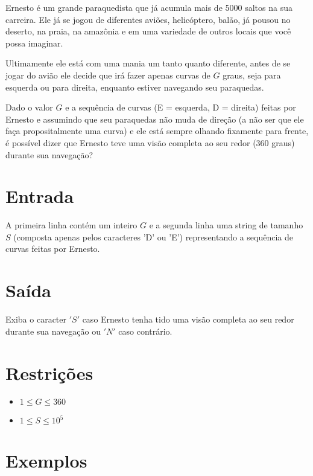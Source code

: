 Ernesto é um grande paraquedista que já acumula mais de 5000 saltos na sua carreira. Ele já se jogou de diferentes aviões, helicóptero, balão, já pousou no deserto, na praia, na amazônia e em uma variedade de outros locais que você possa imaginar. 

Ultimamente ele está com uma mania um tanto quanto diferente, antes de se jogar do avião ele decide que irá fazer apenas curvas de $G$ graus, seja para esquerda ou para direita, enquanto estiver navegando seu paraquedas.

Dado o valor $G$ e a sequência de curvas (E = esquerda, D = direita) feitas por Ernesto e assumindo que seu paraquedas não muda de direção (a não ser que ele faça propositalmente uma curva) e ele está sempre olhando fixamente para frente, é possível dizer que Ernesto teve uma visão completa ao seu redor (360 graus) durante sua navegação?


\section*{Entrada}

A primeira linha contém um inteiro $G$ e a segunda linha uma string de tamanho $S$ (composta apenas pelos caracteres 'D' ou 'E') representando a sequência de curvas feitas por Ernesto.

\section*{Saída}

Exiba o caracter $'S'$ caso Ernesto tenha tido uma visão completa ao seu redor durante sua navegação ou $'N'$ caso contrário.

\section*{Restrições}

\begin{itemize}
\item $1 \leq G \leq 360$
\item $1 \leq S \leq 10^5$
\end{itemize}

\section*{Exemplos}

\exemplo
